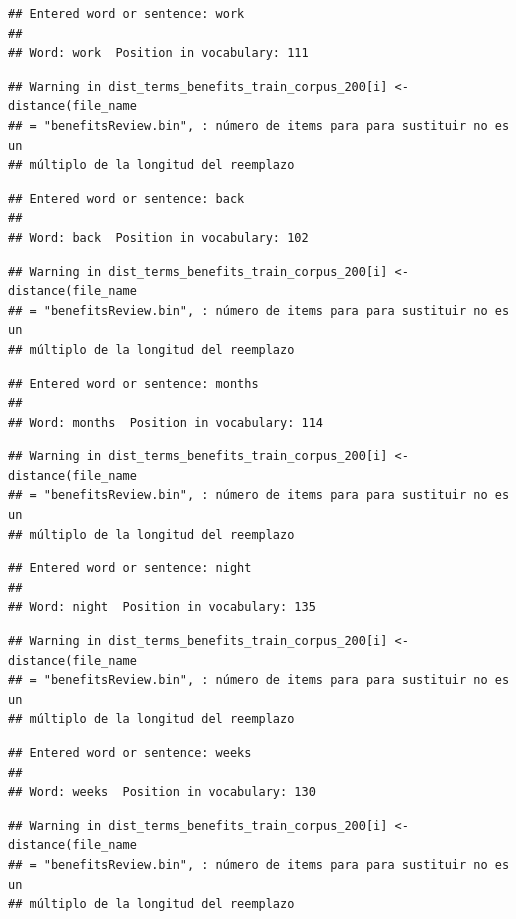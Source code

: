 \documentclass[spanish,]{article}
\begin{document}
\begin{verbatim}
## Entered word or sentence: work
## 
## Word: work  Position in vocabulary: 111
\end{verbatim}

\begin{verbatim}
## Warning in dist_terms_benefits_train_corpus_200[i] <- distance(file_name
## = "benefitsReview.bin", : número de items para para sustituir no es un
## múltiplo de la longitud del reemplazo
\end{verbatim}

\begin{verbatim}
## Entered word or sentence: back
## 
## Word: back  Position in vocabulary: 102
\end{verbatim}

\begin{verbatim}
## Warning in dist_terms_benefits_train_corpus_200[i] <- distance(file_name
## = "benefitsReview.bin", : número de items para para sustituir no es un
## múltiplo de la longitud del reemplazo
\end{verbatim}

\begin{verbatim}
## Entered word or sentence: months
## 
## Word: months  Position in vocabulary: 114
\end{verbatim}

\begin{verbatim}
## Warning in dist_terms_benefits_train_corpus_200[i] <- distance(file_name
## = "benefitsReview.bin", : número de items para para sustituir no es un
## múltiplo de la longitud del reemplazo
\end{verbatim}

\begin{verbatim}
## Entered word or sentence: night
## 
## Word: night  Position in vocabulary: 135
\end{verbatim}

\begin{verbatim}
## Warning in dist_terms_benefits_train_corpus_200[i] <- distance(file_name
## = "benefitsReview.bin", : número de items para para sustituir no es un
## múltiplo de la longitud del reemplazo
\end{verbatim}

\begin{verbatim}
## Entered word or sentence: weeks
## 
## Word: weeks  Position in vocabulary: 130
\end{verbatim}

\begin{verbatim}
## Warning in dist_terms_benefits_train_corpus_200[i] <- distance(file_name
## = "benefitsReview.bin", : número de items para para sustituir no es un
## múltiplo de la longitud del reemplazo
\end{verbatim}
\end{document}
